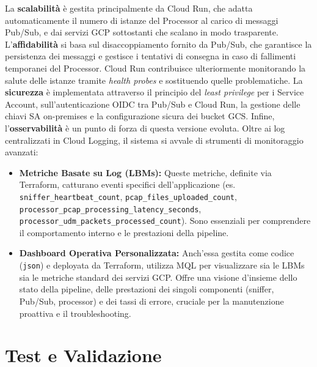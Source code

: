 \documentclass[11pt, a4paper]{article}
\begin{document}
La \textbf{scalabilità} è gestita principalmente da Cloud Run, che adatta automaticamente il numero di istanze del Processor al carico di messaggi Pub/Sub, e dai servizi GCP sottostanti che scalano in modo trasparente.
L'\textbf{affidabilità} si basa sul disaccoppiamento fornito da Pub/Sub, che garantisce la persistenza dei messaggi e gestisce i tentativi di consegna in caso di fallimenti temporanei del Processor. Cloud Run contribuisce ulteriormente monitorando la salute delle istanze tramite \textit{health probes} e sostituendo quelle problematiche.
La \textbf{sicurezza} è implementata attraverso il principio del \textit{least privilege} per i Service Account, sull'autenticazione OIDC tra Pub/Sub e Cloud Run, la gestione delle chiavi SA on-premises e la configurazione sicura dei bucket GCS.
Infine, l'\textbf{osservabilità} è un punto di forza di questa versione evoluta. Oltre ai log centralizzati in Cloud Logging, il sistema si avvale di strumenti di monitoraggio avanzati:
\begin{itemize}
    \item \textbf{Metriche Basate su Log (LBMs):} Queste metriche, definite via Terraform, catturano eventi specifici dell'applicazione (es. \texttt{sniffer\_heartbeat\_count}, \texttt{pcap\_files\_uploaded\_count}, \texttt{processor\_pcap\_processing\_latency\_seconds}, \texttt{processor\_udm\_packets\_processed\_count}). Sono essenziali per comprendere il comportamento interno e le prestazioni della pipeline.
    \item \textbf{Dashboard Operativa Personalizzata:} Anch'essa gestita come codice (\texttt{json}) e deployata da Terraform, utilizza MQL per visualizzare sia le LBMs sia le metriche standard dei servizi GCP. Offre una visione d'insieme dello stato della pipeline, delle prestazioni dei singoli componenti (sniffer, Pub/Sub, processor) e dei tassi di errore, cruciale per la manutenzione proattiva e il troubleshooting.
\end{itemize}

\section{Test e Validazione}
\label{sec:test_validazione}
\end{document}

